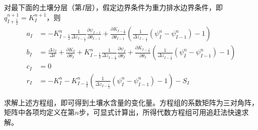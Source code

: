 对最下面的土壤分层（第$I$层），假定边界条件为重力排水边界条件，即$q_{I+\frac{1}{2}}^{n+1}=K_{I}^{n+1}$，则
\begin{equation}
\begin{aligned}
a_I &= - K_{I-\frac{1}{2}}^{n} \frac{1}{\Delta z_{I-\frac{1}{2}}}
     \frac{\partial \psi_{I-1}}{\partial \theta_{I-1}}+\frac{\partial K_{I-\frac{1}{2}}}
     {\partial \theta_{I-1}}\left(\frac{1}{\Delta z_{I-\frac{1}{2}}}\left(\psi_{I}^{n}-\psi_{I-1}^{n}\right)-1\right) \\
b_I &= \frac{\Delta z_{I}}{\Delta t}+\frac{\partial K_{I}}
    {\partial \theta_{I}}+K_{I-\frac{1}{2}}^{n} \frac{1}{\Delta z_{I-\frac{1}{2}}} \frac{\partial \psi_{I}}{\partial \theta_{I}}+
    \frac{\partial K_{I-\frac{1}{2}}}{\partial \theta_{I}}\left(\frac{1}{\Delta z_{I-\frac{1}{2}}}\left(\psi_{I}^{n}-\psi_{I-1}^{n}\right)-1\right) \\
c_I &= 0 \\
r_I &= -K_{I}^{n}-K_{I-\frac{1}{2}}^{n}\left(\frac{1}{\Delta z_{I-\frac{1}{2}}}\left(\psi_{I}^{n}-\psi_{I-1}^{n}\right)-1\right)-S_{I}
\end{aligned}
\end{equation}

求解上述方程组，即可得到土壤水含量的变化量。方程组的系数矩阵为三对角阵，矩阵中各项均定义在第$n$步，可显式计算出，所得代数方程组可用追赶法快速求解。

